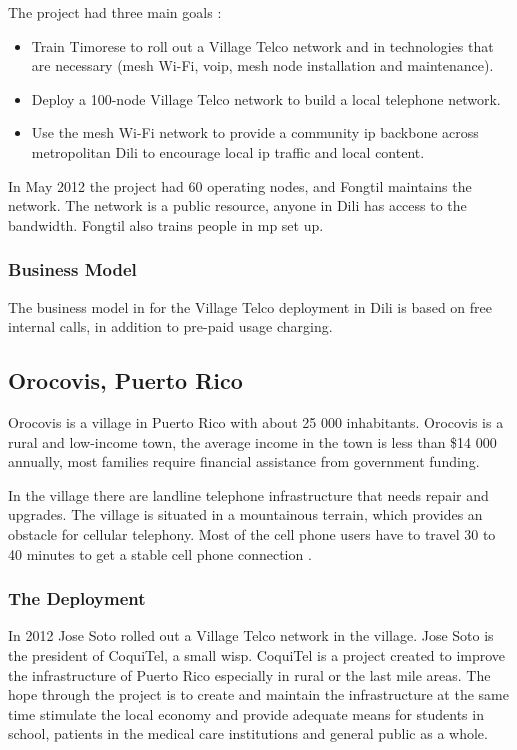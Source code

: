 The project had three main goals \cite{vtdili}:
\begin{itemize}
\item Train Timorese to roll out a Village Telco network and in technologies that are necessary (mesh Wi-Fi, \gls{voip}, mesh node installation and maintenance).
\item Deploy a 100-node Village Telco network to build a local telephone network.
\item Use the mesh Wi-Fi network to provide a community \gls{ip} backbone across metropolitan Dili to encourage local \gls{ip} traffic and local content.
\end{itemize}

In May 2012 the project had 60 operating nodes, and Fongtil maintains the network. The network is a public resource, anyone in Dili has access to the bandwidth. Fongtil also trains people in \gls{mp} set up. 


\subsubsection{Business Model}
The business model in for the Village Telco deployment in Dili is based on free internal calls, in addition to pre-paid usage charging.  

\subsection{Orocovis, Puerto Rico}
Orocovis is a village in Puerto Rico with about 25 000 inhabitants. Orocovis is a rural and low-income town, the average income in the town is less than \$14 000 annually, most families require financial assistance from government funding.   

In the village there are landline telephone infrastructure that needs repair and upgrades. The village is situated in a mountainous terrain, which provides an obstacle for cellular telephony. Most of the cell phone users have to travel 30 to 40 minutes to get a stable cell phone connection \cite{vtpuertorico, soto}. 

\subsubsection{The Deployment}
In 2012 Jose Soto rolled out a Village Telco network in the village. Jose Soto is the president of CoquiTel, a small \gls{wisp}. CoquiTel is a project created to improve the infrastructure of Puerto Rico especially in rural or the last mile areas. The hope through the project is to create and maintain the infrastructure at the same time stimulate the local economy and provide adequate means for students in school, patients in the medical care institutions and general public as a whole.  

